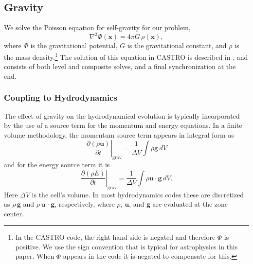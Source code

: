 \documentclass[iop]{emulateapj}
\begin{document}
\subsection{Gravity}
\label{sec:gravity}

We solve the Poisson equation for self-gravity for our problem,
\begin{equation}
  \nabla^2 \Phi(\mathbf{x}) = 4\pi G\, \rho(\mathbf{x}),
\end{equation}
where $\Phi$ is the gravitational potential, $G$ is the gravitational
constant, and $\rho$ is the mass density.\footnote{In the CASTRO code, the 
right-hand side is negated and therefore $\Phi$ is positive. We use the 
sign convention that is typical for astrophysics in this paper. 
When $\Phi$ appears in the code it is negated to compensate for this.} 
The solution of this equation in CASTRO is described in \cite{castro}, and
consists of both level and composite solves, and a final
synchronization at the end.

\subsubsection{Coupling to Hydrodynamics}\label{sec:gravity_hydro_coupling}

The effect of gravity on the hydrodynamical evolution is typically
incorporated by the use of a source term for the momentum and energy
equations. In a finite volume methodology, the momentum source term appears in 
integral form as
\begin{equation}
  \left.\frac{\partial (\rho \mathbf{u})}{\partial t}\right|_{\text{grav}} = \frac{1}{\Delta V} \int \rho \mathbf{g}\, dV
\end{equation}
and for the energy source term it is
\begin{equation}
  \left.\frac{\partial (\rho E)}{\partial t}\right|_{\text{grav}} = \frac{1}{\Delta V} \int \rho \mathbf{u}\cdot\mathbf{g}\, dV \label{eq:cell_center_gravity_source}.
\end{equation}
Here $\Delta V$ is the cell's volume.
In most hydrodynamics codes these are discretized as $\rho\,
\mathbf{g}$ and $\rho\, \mathbf{u}\,\cdot\mathbf{g}$, respectively, 
where $\rho$, $\mathbf{u}$, and $\mathbf{g}$ 
are evaluated at the zone center. 
\end{document}
